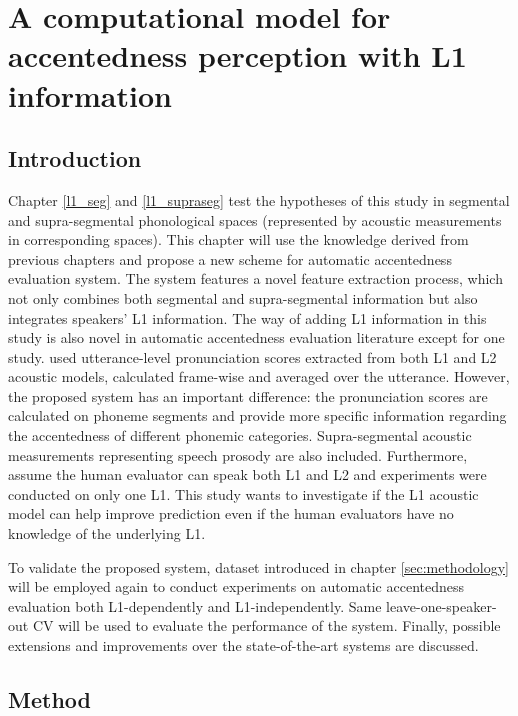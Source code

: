 \chapter{A computational model for accentedness perception with L1 information}
\label{both_l1_l2}

\section{Introduction}

Chapter \ref{l1_seg} and \ref{l1_supraseg} test the hypotheses of this study in segmental and supra-segmental phonological spaces (represented by acoustic measurements in corresponding spaces). This chapter will use the knowledge derived from previous chapters and propose a new scheme for automatic accentedness evaluation system. The system features a novel feature extraction process, which not only combines both segmental and supra-segmental information but also integrates speakers' L1 information. The way of adding L1 information in this study is also novel in automatic accentedness evaluation literature except for one study. \cite{moustroufas2007automatic} used utterance-level pronunciation scores extracted from both L1 and L2 acoustic models, calculated frame-wise and averaged over the utterance. However, the proposed system has an important difference: the pronunciation scores are calculated on phoneme segments and provide more specific information regarding the accentedness of different phonemic categories. Supra-segmental acoustic measurements representing speech prosody are also included. Furthermore, \cite{moustroufas2007automatic} assume the human evaluator can speak both L1 and L2 and experiments were conducted on only one L1. This study wants to investigate if the L1 acoustic model can help improve prediction even if the human evaluators have no knowledge of the underlying L1. 

To validate the proposed system, dataset introduced in chapter \ref{sec:methodology} will be employed again to conduct experiments on automatic accentedness evaluation both L1-dependently and L1-independently. Same leave-one-speaker-out CV will be used to evaluate the performance of the system. Finally, possible extensions and improvements over the state-of-the-art systems are discussed.

\section{Method}

